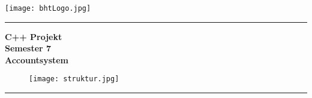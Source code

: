 \thispagestyle{empty}

{\normalsize{}\fontsize{14}{14}\selectfont 
\vspace{-1cm}

\texttt{[image: bhtLogo.jpg]}
\vspace{3.5mm}
\hrule

\begin{center}
	\vspace{0.50cm}
  \parbox{0.9\textwidth}{ 
  \begin{center}
    \LARGE \textbf{C++ Projekt \\[0.5ex]
		               Semester 7  \\[0.5ex]
		               }
    \vspace{0.5cm}
    \LARGE \textbf{Accountsystem \\[0.5ex]}
  \end{center} 
  }
  \vspace{0.5cm}
  \begin{figure}[htb]
    \centering
    \texttt{[image: struktur.jpg]}
  \end{figure}
\end{center}
\vspace{3.0cm}
\hrule
}

\newpage